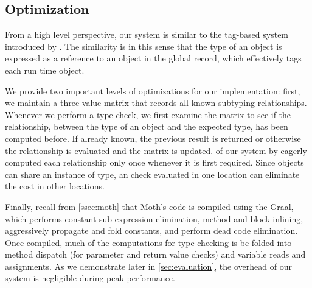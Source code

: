 \subsection{Optimization}
\label{sec:optimization}

From a high level perspective, 
our system is similar to the tag-based system introduced by \citet{Greenman2018}.
The similarity is in this sense that the type of an object is expressed as a reference
to an object in the global record, which
effectively tags each run time object.

We provide two important levels of optimizations for our implementation: 
first, we maintain a three-value matrix that records all known subtyping relationships. 
Whenever we perform a type check, we first examine the matrix to see if the relationship, 
between the type of an object and the expected type, has been computed before.
If already known, the previous result is returned 
or otherwise the relationship is evaluated and the matrix is updated.
 of our system 
by eagerly computed each relationship only once whenever it is first required.
Since objects can share an instance of type,
an check evaluated in one location can eliminate the cost in other locations.

Finally, recall from \cref{ssec:moth} that
Moth's code is compiled using the Graal, 
which performs
constant sub-expression elimination,
method and block inlining,
aggressively propagate and fold constants, and
perform dead code elimination.
Once compiled, much of the computations for type checking
is be folded into method dispatch
(for parameter and return value checks)
and variable reads and assignments.
As we demonstrate later in \cref{sec:evaluation}, 
the overhead of our system is negligible during peak performance.
